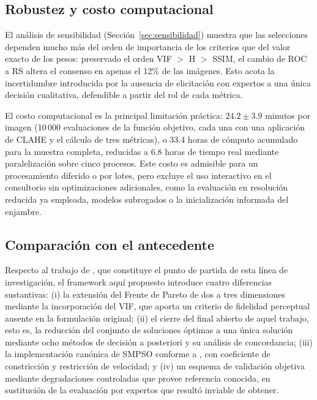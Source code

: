 \subsection{Robustez y costo computacional}

El análisis de sensibilidad (Sección~\ref{sec:sensibilidad}) muestra que las selecciones dependen mucho más del orden de importancia de los criterios que del valor exacto de los pesos: preservado el orden VIF $>$ H $>$ SSIM, el cambio de ROC a RS altera el consenso en apenas el 12\% de las imágenes. Esto acota la incertidumbre introducida por la ausencia de elicitación con expertos a una única decisión cualitativa, defendible a partir del rol de cada métrica.

El costo computacional es la principal limitación práctica: $24.2 \pm 3.9$ minutos por imagen (10\,000 evaluaciones de la función objetivo, cada una con una aplicación de CLAHE y el cálculo de tres métricas), o 33.4 horas de cómputo acumulado para la muestra completa, reducidas a 6.8 horas de tiempo real mediante paralelización sobre cinco procesos. Este costo es admisible para un procesamiento diferido o por lotes, pero excluye el uso interactivo en el consultorio sin optimizaciones adicionales, como la evaluación en resolución reducida ya empleada, modelos subrogados o la inicialización informada del enjambre.

\subsection{Comparación con el antecedente}

Respecto al trabajo de \citet{More2015}, que constituye el punto de partida de esta línea de investigación, el framework aquí propuesto introduce cuatro diferencias sustantivas: (i) la extensión del Frente de Pareto de dos a tres dimensiones mediante la incorporación del VIF, que aporta un criterio de fidelidad perceptual ausente en la formulación original; (ii) el cierre del final abierto de aquel trabajo, esto es, la reducción del conjunto de soluciones óptimas a una única solución mediante ocho métodos de decisión a posteriori y su análisis de concordancia; (iii) la implementación canónica de SMPSO conforme a \citet{Nebro2009}, con coeficiente de constricción y restricción de velocidad; y (iv) un esquema de validación objetiva mediante degradaciones controladas que provee referencia conocida, en sustitución de la evaluación por expertos que resultó inviable de obtener.
